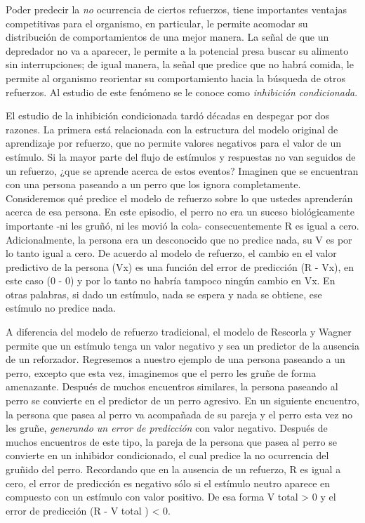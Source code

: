 \documentclass[
  a4paper,
  DIV=11,
  numbers=noendperiod]{scrreprt}
\begin{document}
Poder predecir la \emph{no} ocurrencia de ciertos refuerzos, tiene
importantes ventajas competitivas para el organismo, en particular, le
permite acomodar su distribución de comportamientos de una mejor manera.
La señal de que un depredador no va a aparecer, le permite a la
potencial presa buscar su alimento sin interrupciones; de igual manera,
la señal que predice que no habrá comida, le permite al organismo
reorientar su comportamiento hacia la búsqueda de otros refuerzos. Al
estudio de este fenómeno se le conoce como \emph{inhibición
condicionada}.

El estudio de la inhibición condicionada tardó décadas en despegar por
dos razones. La primera está relacionada con la estructura del modelo
original de aprendizaje por refuerzo, que no permite valores negativos
para el valor de un estímulo. Si la mayor parte del ﬂujo de estímulos y
respuestas no van seguidos de un refuerzo, ¿que se aprende acerca de
estos eventos? Imaginen que se encuentran con una persona paseando a un
perro que los ignora completamente. Consideremos qué predice el modelo
de refuerzo sobre lo que ustedes aprenderán acerca de esa persona. En
este episodio, el perro no era un suceso biológicamente importante -ni
les gruñó, ni les movió la cola- consecuentemente R es igual a cero.
Adicionalmente, la persona era un desconocido que no predice nada, su V
es por lo tanto igual a cero. De acuerdo al modelo de refuerzo, el
cambio en el valor predictivo de la persona (Vx) es una función del
error de predicción (R - Vx), en este caso (0 - 0) y por lo tanto no
habría tampoco ningún cambio en Vx. En otras palabras, si dado un
estímulo, nada se espera y nada se obtiene, ese estímulo no predice
nada.

A diferencia del modelo de refuerzo tradicional, el modelo de Rescorla y
Wagner permite que un estímulo tenga un valor negativo y sea un
predictor de la ausencia de un reforzador. Regresemos a nuestro ejemplo
de una persona paseando a un perro, excepto que esta vez, imaginemos que
el perro les gruñe de forma amenazante. Después de muchos encuentros
similares, la persona paseando al perro se convierte en el predictor de
un perro agresivo. En un siguiente encuentro, la persona que pasea al
perro va acompañada de su pareja y el perro esta vez no les gruñe,
\emph{generando un error de predicción} con valor negativo. Después de
muchos encuentros de este tipo, la pareja de la persona que pasea al
perro se convierte en un inhibidor condicionado, el cual predice la no
ocurrencia del gruñido del perro. Recordando que en la ausencia de un
refuerzo, R es igual a cero, el error de predicción es negativo sólo si
el estímulo neutro aparece en compuesto con un estímulo con valor
positivo. De esa forma V total \textgreater{} 0 y el error de predicción
(R - V total ) \textless{} 0.
\end{document}

